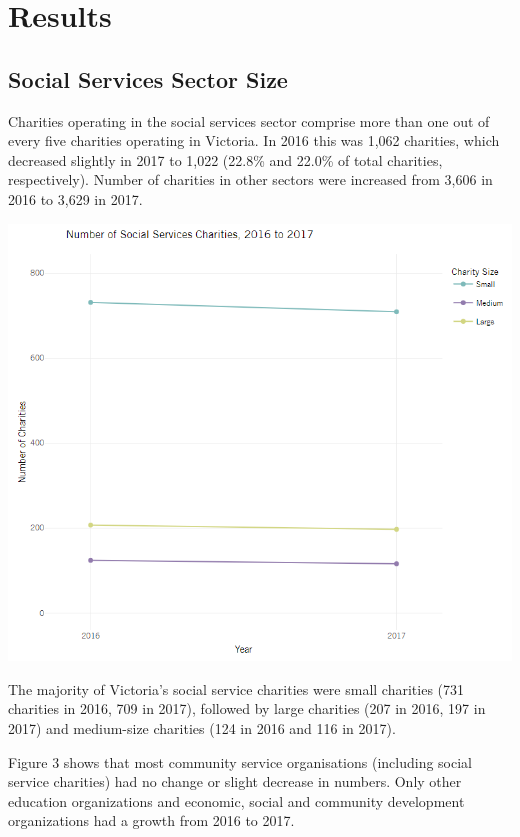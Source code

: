 \documentclass[
  11pt,
]{article}
\let\origfigure\figure
\let\endorigfigure\endfigure
\renewenvironment{figure}[1][2] {
    \expandafter\origfigure\expandafter[H]
} {
    \endorigfigure
}
\begin{document}
\hypertarget{results}{%
\section{Results}\label{results}}

\hypertarget{social-services-sector-size}{%
\subsection{Social Services Sector Size}\label{social-services-sector-size}}

Charities operating in the social services sector comprise more than one out of every five charities operating in Victoria. In 2016 this was 1,062 charities, which decreased slightly in 2017 to 1,022 (22.8\% and 22.0\% of total charities, respectively). Number of charities in other sectors were increased from 3,606 in 2016 to 3,629 in 2017.

\begin{figure}
\centering
\includegraphics{Fig2 SocServ Charity Size.png}
\caption{Count of Social Services Charities by Charity Size}
\end{figure}

The majority of Victoria's social service charities were small charities (731 charities in 2016, 709 in 2017), followed by large charities (207 in 2016, 197 in 2017) and medium-size charities (124 in 2016 and 116 in 2017).

Figure 3 shows that most community service organisations (including social service charities) had no change or slight decrease in numbers. Only other education organizations and economic, social and community development organizations had a growth from 2016 to 2017.
\end{document}
